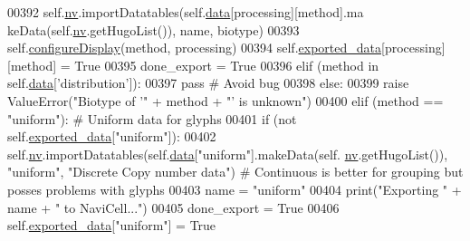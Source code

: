 \begin{DoxyCode}
00392                         self.\hyperlink{classnavicom_1_1navicom_1_1NaviCom_af740fe52f9f3cfc076ae88ca696bd05e}{nv}.importDatatables(self.\hyperlink{classnavicom_1_1navicom_1_1NaviCom_aa1abff245573ed8406c6bddb4596f093}{data}[processing][method].ma
      keData(self.\hyperlink{classnavicom_1_1navicom_1_1NaviCom_af740fe52f9f3cfc076ae88ca696bd05e}{nv}.getHugoList()), name, biotype)
00393                         self.\hyperlink{classnavicom_1_1navicom_1_1NaviCom_a5b6fef64cb29988c7a4c07138c03b5c1}{configureDisplay}(method, processing)
00394                         self.\hyperlink{classnavicom_1_1navicom_1_1NaviCom_a5995e07de24daa015b8b44b1ae0cada7}{exported_data}[processing][method] = \textcolor{keyword}{True}
00395                         done\_export = \textcolor{keyword}{True}
00396                 \textcolor{keywordflow}{elif} (method \textcolor{keywordflow}{in} self.\hyperlink{classnavicom_1_1navicom_1_1NaviCom_aa1abff245573ed8406c6bddb4596f093}{data}[\textcolor{stringliteral}{'distribution'}]):
00397                     \textcolor{keywordflow}{pass} \textcolor{comment}{# Avoid bug}
00398                 \textcolor{keywordflow}{else}:
00399                     \textcolor{keywordflow}{raise} ValueError(\textcolor{stringliteral}{"Biotype of '"} + method + \textcolor{stringliteral}{"' is unknown"})
00400             \textcolor{keywordflow}{elif} (method == \textcolor{stringliteral}{"uniform"}): \textcolor{comment}{# Uniform data for glyphs}
00401                 \textcolor{keywordflow}{if} (\textcolor{keywordflow}{not} self.\hyperlink{classnavicom_1_1navicom_1_1NaviCom_a5995e07de24daa015b8b44b1ae0cada7}{exported_data}[\textcolor{stringliteral}{"uniform"}]):
00402                     self.\hyperlink{classnavicom_1_1navicom_1_1NaviCom_af740fe52f9f3cfc076ae88ca696bd05e}{nv}.importDatatables(self.\hyperlink{classnavicom_1_1navicom_1_1NaviCom_aa1abff245573ed8406c6bddb4596f093}{data}[\textcolor{stringliteral}{"uniform"}].makeData(self.
      \hyperlink{classnavicom_1_1navicom_1_1NaviCom_af740fe52f9f3cfc076ae88ca696bd05e}{nv}.getHugoList()), \textcolor{stringliteral}{"uniform"}, \textcolor{stringliteral}{"Discrete Copy number data"}) \textcolor{comment}{# Continuous is better
       for grouping but posses problems with glyphs}
00403                     name = \textcolor{stringliteral}{"uniform"}
00404                     \textcolor{keywordflow}{print}(\textcolor{stringliteral}{"Exporting "} + name + \textcolor{stringliteral}{" to NaviCell..."})
00405                     done\_export = \textcolor{keyword}{True}
00406                     self.\hyperlink{classnavicom_1_1navicom_1_1NaviCom_a5995e07de24daa015b8b44b1ae0cada7}{exported_data}[\textcolor{stringliteral}{"uniform"}] = \textcolor{keyword}{True}

\end{DoxyCode}
